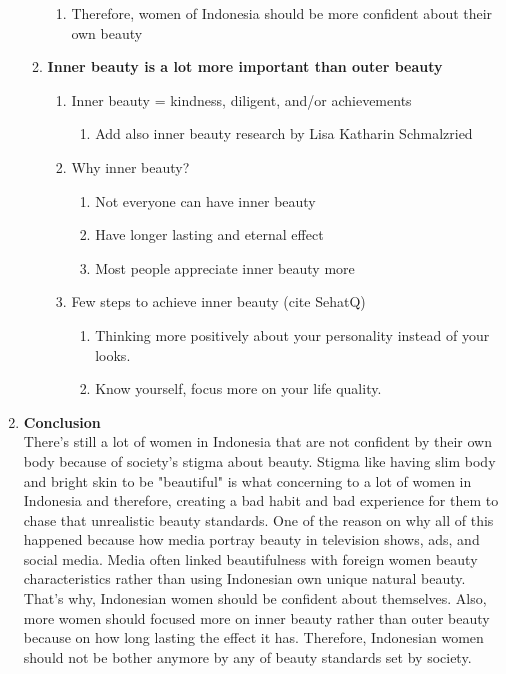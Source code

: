 \documentclass[12pt]{article}
\begin{document}
\begin{enumerate}[label*=\arabic*.]
\begin{enumerate}[label*=\arabic*.]
\begin{enumerate}[label*=\arabic*.]
            \item Therefore, women of Indonesia should be more confident about their own beauty
            \end{enumerate}
        \item \textbf{Inner beauty is a lot more important than outer beauty}
            \begin{enumerate}[label*=\arabic*.]
            \item Inner beauty = kindness, diligent, and/or achievements
                \begin{enumerate}[label*=\arabic*.]
                \item Add also inner beauty research by Lisa Katharin Schmalzried
                \end{enumerate}
            \item Why inner beauty?
                \begin{enumerate}[label*=\arabic*.]
                \item Not everyone can have inner beauty
                \item Have longer lasting and eternal effect
                \item Most people appreciate inner beauty more
                \end{enumerate}
            \item Few steps to achieve inner beauty (cite SehatQ)
                \begin{enumerate}[label*=\arabic*.]
                \item Thinking more positively about your personality instead of your looks.
                \item Know yourself, focus more on your life quality.
                \end{enumerate}
            \end{enumerate}
        \end{enumerate}
    \item {\large\textbf{Conclusion}} \\
            There's still a lot of women in Indonesia that are not confident by
            their own body because of society's stigma about beauty. Stigma like
            having slim body and bright skin to be "beautiful" is what concerning
            to a lot of women in Indonesia and therefore, creating a bad habit
            and bad experience for them to chase that unrealistic beauty standards.
            One of the reason on why all of this happened because how media portray
            beauty in television shows, ads, and social media. Media often linked
            beautifulness with foreign women beauty characteristics rather than
            using Indonesian own unique natural beauty. That's why, Indonesian
            women should be confident about themselves. Also, more women should
            focused more on inner beauty rather than outer beauty because on how
            long lasting the effect it has. Therefore, Indonesian women should
            not be bother anymore by any of beauty standards set by society.
    \end{enumerate}
\end{document}

